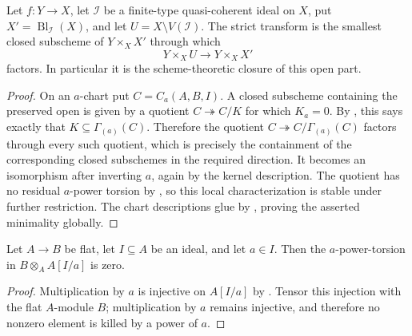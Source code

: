 \begin{lemma}
  \label{lemma:nagata-strict-transform-closure-characterization}

  Let $f\colon Y\to X$, let $\mathcal I$ be a finite-type quasi-coherent
  ideal on $X$, put $X'=\operatorname{Bl}_{\mathcal I}(X)$, and let
  $U=X\setminus V(\mathcal I)$.  The strict transform is the smallest
  closed subscheme of $Y\times_XX'$ through which
  \[
    Y\times_XU\longrightarrow Y\times_XX'
  \]
  factors.  In particular it is the scheme-theoretic closure of this open
  part.
\end{lemma}

\begin{proof}
  On an $a$-chart put $C=C_a(A,B,I)$.  A closed subscheme containing the
  preserved open is given by a quotient $C\twoheadrightarrow C/K$ for which
  $K_a=0$.  By
  , this says exactly
  that $K\subseteq\Gamma_{(a)}(C)$.  Therefore the quotient
  $C\twoheadrightarrow C/\Gamma_{(a)}(C)$ factors through every such
  quotient, which is precisely the containment of the corresponding closed
  subschemes in the required direction.  It becomes an isomorphism after
  inverting $a$, again by the kernel description.  The quotient has no
  residual $a$-power torsion by
  , so this local
  characterization is stable under further restriction.  The chart
  descriptions glue by
  , proving the
  asserted minimality globally.
\end{proof}

\begin{lemma}
  \label{lemma:nagata-flat-strict-transform-no-torsion}

  Let $A\to B$ be flat, let $I\subseteq A$ be an ideal, and let $a\in I$.
  Then the $a$-power-torsion in
  $B\otimes_AA[I/a]$ is zero.
\end{lemma}

\begin{proof}
  Multiplication by $a$ is injective on $A[I/a]$ by
  .  Tensor this injection with the
  flat $A$-module $B$; multiplication by $a$ remains injective, and therefore
  no nonzero element is killed by a power of $a$.
\end{proof}

